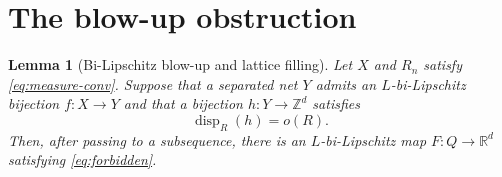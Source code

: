 \documentclass[10pt]{article}
\newtheorem{lemma}{Lemma}
\newcommand{\R}{\mathbb R}
\newcommand{\Z}{\mathbb Z}
\newcommand{\disp}{\operatorname{disp}}
\begin{document}
\section{The blow-up obstruction}

\begin{lemma}[Bi-Lipschitz blow-up and lattice filling]\label{lem:blowup}
Let $X$ and $R_n$ satisfy \eqref{eq:measure-conv}.  Suppose that a separated
net $Y$ admits an $L$-bi-Lipschitz bijection $f:X\to Y$ and that a bijection
$h:Y\to\Z^d$ satisfies
\begin{equation}\label{eq:sublinear}
 \disp_R(h)=o(R).
\end{equation}
Then, after passing to a subsequence, there is an $L$-bi-Lipschitz map
$F:Q\to\R^d$ satisfying \eqref{eq:forbidden}.
\end{lemma}
\end{document}
